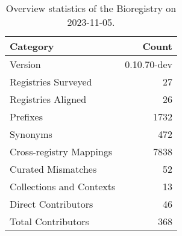 \begin{table}
\caption{Overview statistics of the Bioregistry on 2023-11-05.}
\label{tab:bioregistry-summary}
\begin{tabular}{lr}
\toprule
Category & Count \\
\midrule
Version & 0.10.70-dev \\
Registries Surveyed & 27 \\
Registries Aligned & 26 \\
Prefixes & 1732 \\
Synonyms & 472 \\
Cross-registry Mappings & 7838 \\
Curated Mismatches & 52 \\
Collections and Contexts & 13 \\
Direct Contributors & 46 \\
Total Contributors & 368 \\
\bottomrule
\end{tabular}
\end{table}
